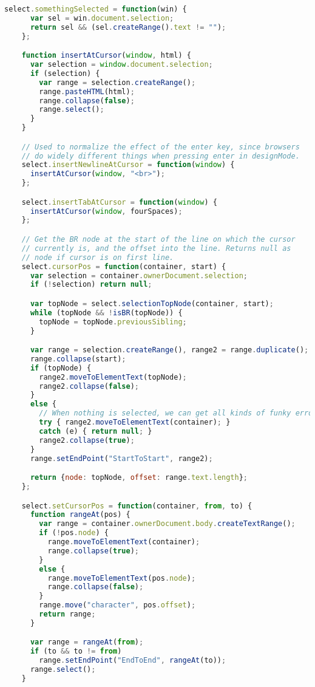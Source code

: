 \begin{lstlisting}[language=Javascript]
    select.somethingSelected = function(win) {
      var sel = win.document.selection;
      return sel && (sel.createRange().text != "");
    };

    function insertAtCursor(window, html) {
      var selection = window.document.selection;
      if (selection) {
        var range = selection.createRange();
        range.pasteHTML(html);
        range.collapse(false);
        range.select();
      }
    }

    // Used to normalize the effect of the enter key, since browsers
    // do widely different things when pressing enter in designMode.
    select.insertNewlineAtCursor = function(window) {
      insertAtCursor(window, "<br>");
    };

    select.insertTabAtCursor = function(window) {
      insertAtCursor(window, fourSpaces);
    };

    // Get the BR node at the start of the line on which the cursor
    // currently is, and the offset into the line. Returns null as
    // node if cursor is on first line.
    select.cursorPos = function(container, start) {
      var selection = container.ownerDocument.selection;
      if (!selection) return null;

      var topNode = select.selectionTopNode(container, start);
      while (topNode && !isBR(topNode)) {
        topNode = topNode.previousSibling;
      }

      var range = selection.createRange(), range2 = range.duplicate();
      range.collapse(start);
      if (topNode) {
        range2.moveToElementText(topNode);
        range2.collapse(false);
      }
      else {
        // When nothing is selected, we can get all kinds of funky errors here.
        try { range2.moveToElementText(container); }
        catch (e) { return null; }
        range2.collapse(true);
      }
      range.setEndPoint("StartToStart", range2);

      return {node: topNode, offset: range.text.length};
    };

    select.setCursorPos = function(container, from, to) {
      function rangeAt(pos) {
        var range = container.ownerDocument.body.createTextRange();
        if (!pos.node) {
          range.moveToElementText(container);
          range.collapse(true);
        }
        else {
          range.moveToElementText(pos.node);
          range.collapse(false);
        }
        range.move("character", pos.offset);
        return range;
      }

      var range = rangeAt(from);
      if (to && to != from)
        range.setEndPoint("EndToEnd", rangeAt(to));
      range.select();
    }


\end{lstlisting}

